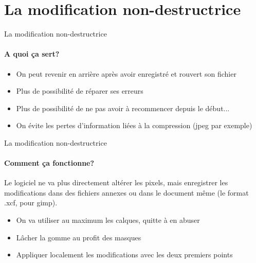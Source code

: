 \documentclass[10pt,svgnames,usenames,table]{beamer}
\begin{document}
\section{La modification non-destructrice}
	\begin{frame}{La modification non-destructrice}
	\framesubtitle{A quoi ça sert?}
	\begin{itemize}
		\item On peut revenir en arrière après avoir enregistré et rouvert son fichier
		\item Plus de possibilité de réparer ses erreurs
		\item Plus de possibilité de ne pas avoir à recommencer depuis le début...
		\item On évite les pertes d'information liées à la compression (jpeg par exemple)
	\end{itemize}	
	\end{frame}

	\begin{frame}{La modification non-destructrice}
	\framesubtitle{Comment ça fonctionne?}
	Le logiciel ne va plus directement altérer les pixels, mais enregistrer les modifications dans des fichiers annexes ou dans le document même (le format .xcf, pour gimp).
	\begin{itemize}
	\item On va utiliser au maximum les calques, quitte à en abuser
	\item Lâcher la gomme au profit des masques
	\item Appliquer localement les modifications avec les deux premiers points
	\end{itemize}	
	\end{frame}



\end{document}
